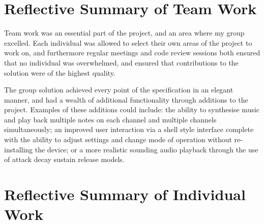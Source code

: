 \section{Reflective Summary of Team Work}

Team work was an essential part of the project, and an area where my group 
excelled. Each individual was allowed to select their own areas of the project 
to work on, and furthermore regular meetings and code review sessions both ensured 
that no individual was overwhelmed, and ensured that contributions to the 
solution were of the highest quality. 
\par\bigskip\noindent
The group solution achieved every point of the specification in an elegant 
manner, and had a wealth of additional functionality through additions to the 
project. 
Examples of these additions could include: the ability to synthesise music and 
play back multiple notes on each channel and multiple channels simultaneously; 
an improved user interaction via a shell style interface complete with the 
ability to adjust settings and change mode of operation without re-installing the 
device; or a more realistic sounding audio playback through the use of attack
decay sustain release models. 

\section{Reflective Summary of Individual Work}

